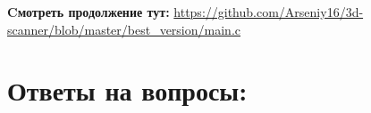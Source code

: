 \documentclass[a4paper, 12pt, twoside]{article}
\begin{document}
\begin{center}
	\textbf{Cмотреть продолжение тут:} \url{https://github.com/Arseniy16/3d-scanner/blob/master/best_version/main.c}
\end{center}

\section*{Ответы на вопросы:}

\end{document}
